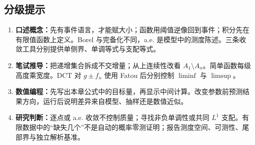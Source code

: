 \subsection*{分级提示}
\begingroup\small
\begin{enumerate}[nosep,leftmargin=*]
  \item \textbf{口述概念：}先有事件语言，才能赋大小；函数用阈值逆像回到事件；积分先在有限值函数上定义。Borel 与完备化不同，a.e. 是模型中的测度陈述。三条收敛工具分别提供单侧界、单调等式与支配等式。
  \item \textbf{笔试推导：}把递增集合拆成不交增量；从上连续性改看 $A_1\setminus A_n$。简单函数每级高度乘宽度。DCT 对 $g\pm f_n$ 使用 Fatou 后分别控制 $\liminf$ 与 $\limsup$。
  \item \textbf{数值编程：}先写出本章公式中的目标量，再显示中间计算。改变参数前预测结果方向，运行后说明差异来自模型、抽样还是数值近似。
  \item \textbf{研究判断：}逐点或 a.e. 收敛不控制质量；寻找非负单调性或共同 $L^1$ 支配。有限数据中的“缺失几个”不是自动的概率零测证明；报告测度空间、可测性、尾部界与独立解析基准。
\end{enumerate}
\endgroup
